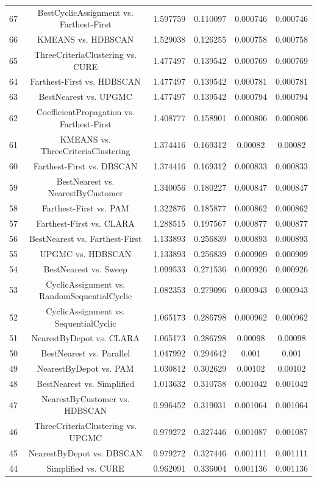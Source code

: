 \documentclass[a4paper,10pt]{article}
\begin{document}
\begin{landscape}
\begin{table}[!htp]
\begin{tabular}{cccccc}
67&BestCyclicAssignment vs. Farthest-First&1.597759&0.110097&0.000746&0.000746\\
66&KMEANS vs. HDBSCAN&1.529038&0.126255&0.000758&0.000758\\
65&ThreeCriteriaClustering vs. CURE&1.477497&0.139542&0.000769&0.000769\\
64&Farthest-First vs. HDBSCAN&1.477497&0.139542&0.000781&0.000781\\
63&BestNearest vs. UPGMC&1.477497&0.139542&0.000794&0.000794\\
62&CoefficientPropagation vs. Farthest-First&1.408777&0.158901&0.000806&0.000806\\
61&KMEANS vs. ThreeCriteriaClustering&1.374416&0.169312&0.00082&0.00082\\
60&Farthest-First vs. DBSCAN&1.374416&0.169312&0.000833&0.000833\\
59&BestNearest vs. NearestByCustomer&1.340056&0.180227&0.000847&0.000847\\
58&Farthest-First vs. PAM&1.322876&0.185877&0.000862&0.000862\\
57&Farthest-First vs. CLARA&1.288515&0.197567&0.000877&0.000877\\
56&BestNearest vs. Farthest-First&1.133893&0.256839&0.000893&0.000893\\
55&UPGMC vs. HDBSCAN&1.133893&0.256839&0.000909&0.000909\\
54&BestNearest vs. Sweep&1.099533&0.271536&0.000926&0.000926\\
53&CyclicAssignment vs. RandomSequentialCyclic&1.082353&0.279096&0.000943&0.000943\\
52&CyclicAssignment vs. SequentialCyclic&1.065173&0.286798&0.000962&0.000962\\
51&NearestByDepot vs. CLARA&1.065173&0.286798&0.00098&0.00098\\
50&BestNearest vs. Parallel&1.047992&0.294642&0.001&0.001\\
49&NearestByDepot vs. PAM&1.030812&0.302629&0.00102&0.00102\\
48&BestNearest vs. Simplified&1.013632&0.310758&0.001042&0.001042\\
47&NearestByCustomer vs. HDBSCAN&0.996452&0.319031&0.001064&0.001064\\
46&ThreeCriteriaClustering vs. UPGMC&0.979272&0.327446&0.001087&0.001087\\
45&NearestByDepot vs. DBSCAN&0.979272&0.327446&0.001111&0.001111\\
44&Simplified vs. CURE&0.962091&0.336004&0.001136&0.001136\\

\end{tabular}
\end{table}
\end{landscape}
\end{document}
